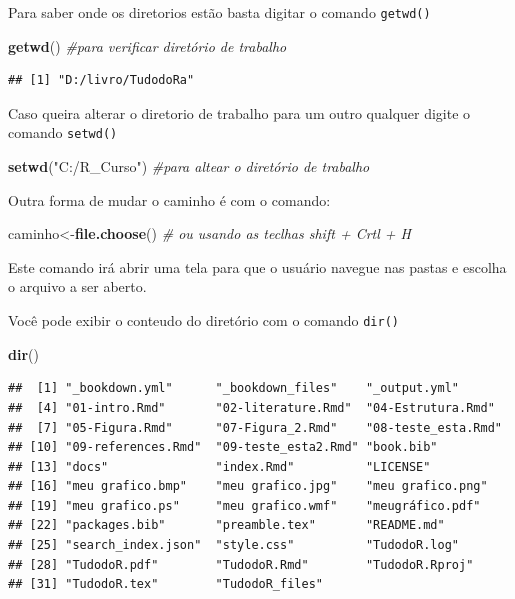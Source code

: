 \documentclass[
]{book}
\newenvironment{Shaded}{\begin{snugshade}}{\end{snugshade}}
\newcommand{\CommentTok}[1]{\textcolor[rgb]{0.56,0.35,0.01}{\textit{#1}}}
\newcommand{\KeywordTok}[1]{\textcolor[rgb]{0.13,0.29,0.53}{\textbf{#1}}}
\newcommand{\NormalTok}[1]{#1}
\newcommand{\StringTok}[1]{\textcolor[rgb]{0.31,0.60,0.02}{#1}}
\begin{document}
Para saber onde os diretorios estão basta digitar o comando \texttt{getwd()}

\begin{Shaded}
\begin{Highlighting}[]
 \KeywordTok{getwd}\NormalTok{() }\CommentTok{#para verificar  diretório de trabalho}
\end{Highlighting}
\end{Shaded}

\begin{verbatim}
## [1] "D:/livro/TudodoRa"
\end{verbatim}

Caso queira alterar o diretorio de trabalho para um outro qualquer digite o comando \texttt{setwd()}

\begin{Shaded}
\begin{Highlighting}[]
\KeywordTok{setwd}\NormalTok{(}\StringTok{"C:/R_Curso"}\NormalTok{) }\CommentTok{#para  altear o diretório de trabalho}
\end{Highlighting}
\end{Shaded}

Outra forma de mudar o caminho é com o comando:

\begin{Shaded}
\begin{Highlighting}[]
\NormalTok{caminho<-}\KeywordTok{file.choose}\NormalTok{() }\CommentTok{# ou usando as teclhas shift + Crtl + H}
\end{Highlighting}
\end{Shaded}

Este comando irá abrir uma tela para que o usuário navegue nas pastas e escolha o arquivo a ser aberto.

Você pode exibir o conteudo do diretório com o comando \texttt{dir()}

\begin{Shaded}
\begin{Highlighting}[]
\KeywordTok{dir}\NormalTok{()}
\end{Highlighting}
\end{Shaded}

\begin{verbatim}
##  [1] "_bookdown.yml"      "_bookdown_files"    "_output.yml"       
##  [4] "01-intro.Rmd"       "02-literature.Rmd"  "04-Estrutura.Rmd"  
##  [7] "05-Figura.Rmd"      "07-Figura_2.Rmd"    "08-teste_esta.Rmd" 
## [10] "09-references.Rmd"  "09-teste_esta2.Rmd" "book.bib"          
## [13] "docs"               "index.Rmd"          "LICENSE"           
## [16] "meu grafico.bmp"    "meu grafico.jpg"    "meu grafico.png"   
## [19] "meu grafico.ps"     "meu grafico.wmf"    "meugráfico.pdf"    
## [22] "packages.bib"       "preamble.tex"       "README.md"         
## [25] "search_index.json"  "style.css"          "TudodoR.log"       
## [28] "TudodoR.pdf"        "TudodoR.Rmd"        "TudodoR.Rproj"     
## [31] "TudodoR.tex"        "TudodoR_files"
\end{verbatim}
\end{document}

